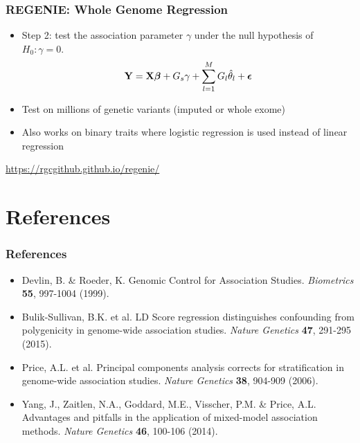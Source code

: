 \documentclass{beamer}
\newcommand{\bepsilon}{\mbox{\boldmath$\epsilon$}}
\begin{document}
\begin{frame}
	\frametitle{\bf  REGENIE: Whole Genome Regression}
	\begin{itemize}
		\item Step 2:  test the association parameter $\gamma$ under the null hypothesis of $H_0: \gamma=0.$
		$$ \mathbf{Y}= \mathbf{X}\boldsymbol{\beta} + G_s\gamma+ \sum_{l=1}^MG_l\hat\theta_l + \bepsilon  $$
		\item Test on millions of genetic variants (imputed or whole exome)
		\item Also works on binary traits where logistic regression is used instead of linear regression
		\end{itemize}
\centering\url{https://rgcgithub.github.io/regenie/}
\end{frame}


\section{References}


\begin{frame}
\frametitle{\bf References}
\begin{itemize}

\item  Devlin, B. \& Roeder, K. Genomic Control for Association Studies. \textit{Biometrics} \textbf{55}, 997-1004 (1999).
\item Bulik-Sullivan, B.K. et al. LD Score regression distinguishes confounding from polygenicity in genome-wide association studies. \textit{Nature Genetics} \textbf{47}, 291-295 (2015).
\item Price, A.L. et al. Principal components analysis corrects for stratification in genome-wide association studies.\textit{ Nature Genetics} \textbf{38}, 904-909 (2006).
\item Yang, J., Zaitlen, N.A., Goddard, M.E., Visscher, P.M. \& Price, A.L. Advantages and pitfalls in the application of mixed-model association methods. \textit{Nature Genetics} \textbf{46}, 100-106 (2014).

\end{itemize}

\end{frame}
\end{document}
